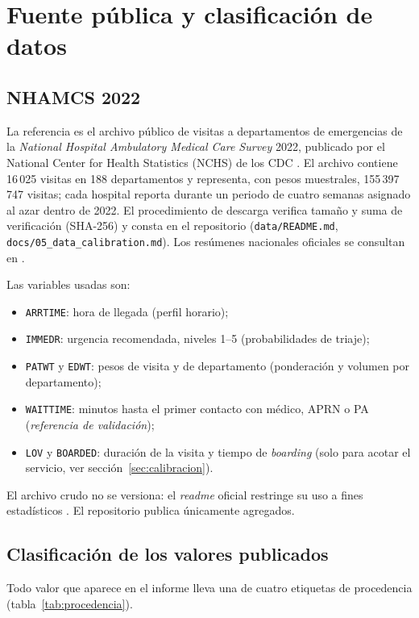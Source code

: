\section{Fuente pública y clasificación de datos}

\subsection{NHAMCS 2022}
La referencia es el archivo público de visitas a departamentos de emergencias de la
\emph{National Hospital Ambulatory Medical Care Survey} 2022, publicado por el National
Center for Health Statistics (NCHS) de los CDC
\citep{nhamcs2022doc,nhamcs2022data,nhamcs2022dictionary}. El archivo contiene 16\,025
visitas en 188 departamentos y representa, con pesos muestrales, 155\,397\,747 visitas;
cada hospital reporta durante un periodo de cuatro semanas asignado al azar dentro de 2022.
El procedimiento de descarga verifica tamaño y suma de verificación (SHA-256) y consta en
el repositorio (\texttt{data/README.md}, \texttt{docs/05\_data\_calibration.md}). Los
resúmenes nacionales oficiales se consultan en \citet{nhamcs2022tables}.

Las variables usadas son:
\begin{itemize}
  \item \texttt{ARRTIME}: hora de llegada (perfil horario);
  \item \texttt{IMMEDR}: urgencia recomendada, niveles 1--5 (probabilidades de triaje);
  \item \texttt{PATWT} y \texttt{EDWT}: pesos de visita y de departamento (ponderación y
  volumen por departamento);
  \item \texttt{WAITTIME}: minutos hasta el primer contacto con médico, APRN o PA
  (\emph{referencia de validación});
  \item \texttt{LOV} y \texttt{BOARDED}: duración de la visita y tiempo de \emph{boarding}
  (solo para acotar el servicio, ver sección~\ref{sec:calibracion}).
\end{itemize}

El archivo crudo no se versiona: el \emph{readme} oficial restringe su uso a fines
estadísticos \citep{nhamcs2022readme}. El repositorio publica únicamente agregados.

\subsection{Clasificación de los valores publicados}
Todo valor que aparece en el informe lleva una de cuatro etiquetas de procedencia
(tabla~\ref{tab:procedencia}).

